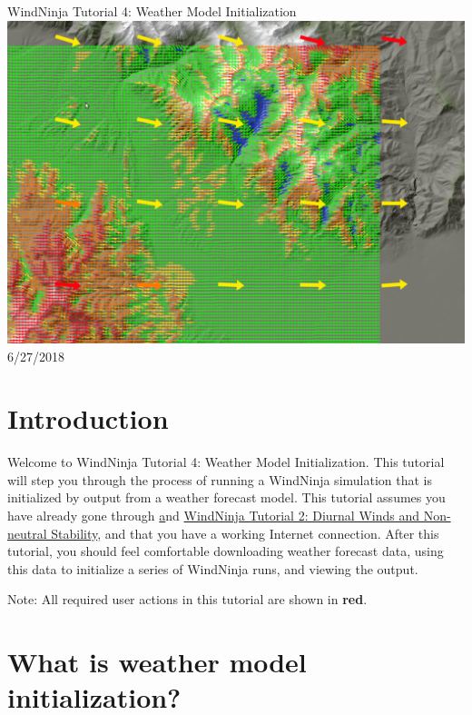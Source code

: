 \documentclass[12pt]{article}
\begin{document}
\begin{titlepage}
    \centering
    {\Huge
       WindNinja Tutorial 4: Weather Model Initialization
    }    
    \vfill
    \includegraphics[scale=0.35]							{title_fig}
    \vfill
  	{\Huge
	  6/27/2018 %
  	}
    \vfill
\end{titlepage}

\section*{Introduction}

Welcome to WindNinja Tutorial 4: Weather Model Initialization.  This tutorial will step you through the process of running a WindNinja simulation that is initialized by output from a weather forecast model.  This tutorial assumes you have already gone through \href{http://firelab.github.io/windninja/pdf/WindNinja_tutorial1.pdf} and \href{http://firelab.github.io/windninja/pdf/WindNinja_tutorial2.pdf}{WindNinja Tutorial 2: Diurnal Winds and Non-neutral Stability}, and that you have a working Internet connection.  After this tutorial, you should feel comfortable downloading weather forecast data, using this data to initialize a series of WindNinja runs, and viewing the output.
    
Note:  All required user actions in this tutorial are shown in \textbf{\color{red}red}.

\section*{What is weather model initialization?}
\end{document}
